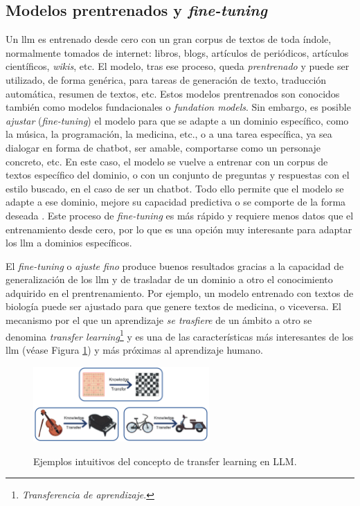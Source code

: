 \subsection{Modelos prentrenados y \emph{fine-tuning}} 
Un \gls{llm} es entrenado desde cero con un gran corpus de textos de toda índole, normalmente tomados de internet: libros, blogs, artículos de periódicos, artículos científicos, \emph{wikis}, etc. El modelo, tras ese proceso, queda \emph{prentrenado} \citep{hanPreTrainedModelsPresent2021} y puede ser utilizado, de forma genérica, para tareas de generación de texto, traducción automática, resumen de textos, etc. Estos modelos prentrenados son conocidos también como modelos fundacionales o \emph{fundation models}. Sin embargo, es posible \emph{ajustar} (\emph\emph{fine-tuning}) el modelo para que se adapte a un dominio específico, como la música, la programación, la medicina, etc., o a una tarea específica, ya sea dialogar en forma de {chatbot}, ser amable, comportarse como un personaje concreto, etc. En este caso, el modelo se vuelve a entrenar con un corpus de textos específico del dominio, o con un conjunto de preguntas y respuestas con el estilo buscado, en el caso de ser un {chatbot}. Todo ello permite que el modelo se adapte a ese dominio, mejore su capacidad predictiva o se comporte de la forma deseada \citep{tianFinetuningLanguageModels2023}. Este proceso de \emph{fine-tuning} es más rápido y requiere menos datos que el entrenamiento desde cero, por lo que es una opción muy interesante para adaptar los \gls{llm} a dominios específicos.

El \emph{fine-tuning} o \emph{ajuste fino} produce buenos resultados gracias a la capacidad de generalización de los \gls{llm} y de trasladar de un dominio a otro el conocimiento adquirido en el prentrenamiento. Por ejemplo, un modelo entrenado con textos de biología puede ser {ajustado} para que genere textos de medicina, o viceversa. El mecanismo por el que un aprendizaje \emph{se trasfiere} de un ámbito a otro se denomina \emph{transfer learning}\footnote{\emph{Transferencia de aprendizaje}.} \citep{zhuangComprehensiveSurveyTransfer2020} y es una de las características más interesantes de los \gls{llm} (véase Figura \ref{fig:transfer_learning}) y más próximas al aprendizaje humano.

\begin{figure}[H]
    \caption[Ejemplos intuitivos del concepto de {transfer learning} en LLM]{Ejemplos intuitivos del concepto de {transfer learning} en LLM.}
    \centering
    \includegraphics[width=0.6\textwidth]{./figuras/transfer_learning.png}
    \label{fig:transfer_learning}
\end{figure}


